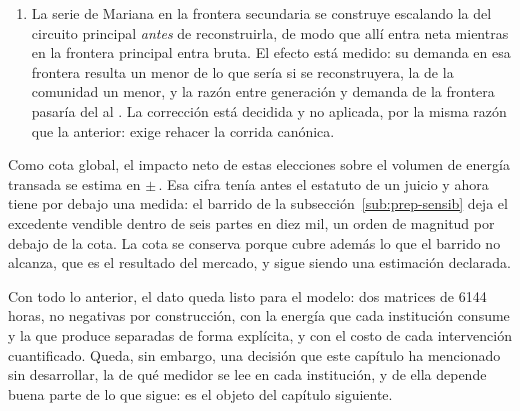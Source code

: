 \begin{enumerate}[leftmargin=*, itemsep=0.35em]
 \item La serie de Mariana en la frontera secundaria se construye
 escalando la del circuito principal \emph{antes} de reconstruirla, de
 modo que allí entra neta mientras en la frontera principal entra bruta.
 El efecto está medido: su demanda en esa frontera resulta un 
 menor de lo que sería si se reconstruyera, la de la comunidad un
  menor, y la razón entre generación y demanda de la frontera
 pasaría del  al . La corrección está decidida y no
 aplicada, por la misma razón que la anterior: exige rehacer la corrida
 canónica.
\end{enumerate}

Como cota global, el impacto neto de estas elecciones sobre el volumen de
energía transada se estima en $\pm$\,. Esa cifra tenía antes el
estatuto de un juicio y ahora tiene por debajo una medida: el barrido de la
subsección~\ref{sub:prep-sensib} deja el excedente vendible dentro de seis
partes en diez mil, un orden de magnitud por debajo de la cota. La cota se
conserva porque cubre además lo que el barrido no alcanza, que es el
resultado del mercado, y sigue siendo una estimación declarada.

Con todo lo anterior, el dato queda listo para el modelo: dos matrices de
\num{6144} horas, no negativas por construcción, con la energía que cada
institución consume y la que produce separadas de forma explícita, y con
el costo de cada intervención cuantificado. Queda, sin embargo, una decisión
que este capítulo ha mencionado sin desarrollar, la de qué medidor se lee
en cada institución, y de ella depende buena parte de lo que sigue: es el
objeto del capítulo siguiente.
